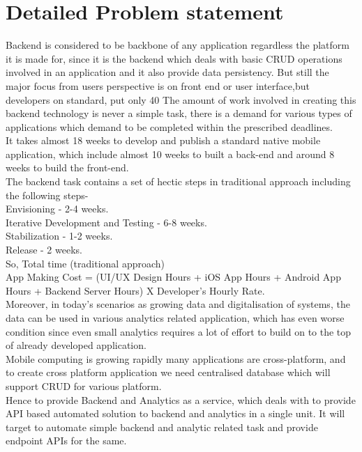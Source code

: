 \documentclass[a4paper,12pt]{report}
\begin{document}
    \section{Detailed Problem statement}
    \label{sec:theory}
    Backend is considered to be backbone of any application regardless the platform it is made for, since it is the backend which deals with basic CRUD operations involved in an application and it also provide data persistency. But still the major focus from users perspective is on front end or user interface,but developers on standard, put only 40%
    The amount of work involved in creating this backend technology is never a simple task, there is a demand for various types of applications which demand to be completed within the prescribed deadlines. \\
    It takes almost 18 weeks to develop and publish a standard native mobile application, which include almost 10 weeks to built a back-end and around 8 weeks to build the front-end.\\
    The backend task contains a set of hectic steps in traditional approach including the following steps-\\
    Envisioning - 2-4 weeks.\\
    Iterative Development and Testing - 6-8 weeks.\\
    Stabilization - 1-2 weeks.\\
    Release - 2 weeks.\\
    So, Total time (traditional approach) \\
    App Making Cost = (UI/UX Design Hours + iOS App Hours + Android App Hours + Backend Server Hours) X Developer’s Hourly Rate.\\    
    Moreover, in today’s scenarios as growing data and digitalisation of systems, the data can be used in various analytics related application, which has even worse condition since even small analytics requires a lot of effort to build on to the top of already developed application.\\    
    Mobile computing is growing rapidly many applications are cross-platform, and to create cross platform application we need centralised database which will support CRUD for various platform.\\
    Hence to provide Backend and Analytics as a service, which deals with to provide API based automated solution to backend and analytics in a single unit. It will target to automate simple backend and analytic related task and provide endpoint APIs for the same.\\    
\end{document}

